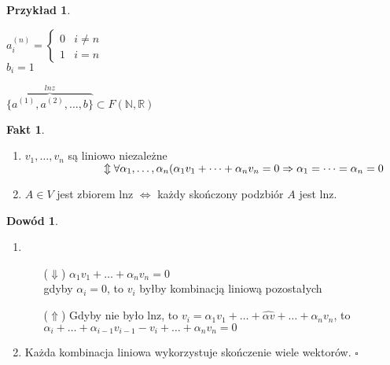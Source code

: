 \documentclass[12pt,a4paper]{article}
\newcommand{\RR}{\mathbb{R}}
\renewcommand{\qed}{$\square$}
\theoremstyle{plain}
\theoremstyle{definition}
\newtheorem{ft}{Fakt}[section]
\theoremstyle{definition}
\theoremstyle{definition}
\theoremstyle{definition}
\newtheorem*{dd}{Dowód}
\theoremstyle{definition}
\newtheorem*{prz}{Przykład}
\theoremstyle{definition}
\theoremstyle{definition}
\begin{document}
\begin{prz}
    ~\\
    \begin{minipage}[t]{0.5\textwidth}
    $
    a^{(n)}_i = \begin{cases}
                0 & i \neq n \\ 
                1 & i = n
              \end{cases}
    $ \\
    $b_i = 1$
    \end{minipage}%
    \begin{minipage}[t]{0.5\textwidth}
       $\overbrace{\{a^{(1)},a^{(2)},\dots,b\}}^{lnz} \subset F(\mathbb{N},\RR)$
        
    \end{minipage}
\end{prz}

\newpage

\begin{ft} \hfill
    \begin{enumerate}[{(}1{)}]
         \item $v_1,\dots,v_n$ są liniowo niezależne \\
        $ \hspace*{25mm} \Updownarrow 
        \\ 
        \forall \alpha_1,\dots,\alpha_n(\alpha_1v_1+\dots+\alpha_nv_n = 0 \Rightarrow \alpha_1 = \dots = \alpha_n =0$ 
        \item $A \in V $ jest zbiorem lnz $\iff$ każdy skończony podzbiór $A$ jest lnz.
    \end{enumerate}
\end{ft}

\begin{dd} \hfill 
    \begin{enumerate}[{(}1{)}]
        \item \begin{itemize}
            \item[($\Downarrow$)] $\alpha_1v_1 + \dots + \alpha_nv_n = 0$ \\
                gdyby $\alpha_i = 0 $, to $v_i$ byłby kombinacją liniową pozostałych \lightning
            \item[($\Uparrow$)] Gdyby nie było lnz, to $v_i = \alpha_1v_1+\dots+ \hat{\alpha v} +\dots + \alpha_nv_n$, to \\ $\alpha_i + \dots + \alpha_{i-1}v_{i-1} - v_i + \dots + \alpha_nv_n = 0 $ \lightning
        \end{itemize}
        \item Każda kombinacja liniowa wykorzystuje skończenie wiele wektorów. \qed
    \end{enumerate}
\end{dd} 
\end{document}
